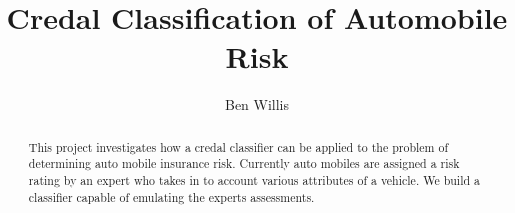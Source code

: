 \documentclass[11pt]{report}
\begin{document}
\title{Credal Classification of Automobile Risk}
\author{Ben Willis}
\maketitle

\begin{abstract}
	This project investigates how a credal classifier can be applied to the problem of determining auto mobile insurance risk. Currently auto mobiles are assigned a risk rating by an expert who takes in to account various attributes of a vehicle. We build a classifier capable of emulating the experts assessments.
\end{abstract}

\tableofcontents







\end{document}
